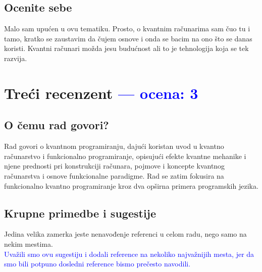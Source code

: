 \documentclass[a4paper]{report}
\newcommand{\odgovor}[1]{\textcolor{blue}{#1}}
\begin{document}
\section{Ocenite sebe}

Malo sam upućen u ovu tematiku. Prosto, o kvantnim računarima sam čuo tu i tamo, 
kratko se zaustavim da čujem osnove i onda se bacim na ono što se danas koristi. 
Kvantni računari možda jesu budućnost ali to je tehnologija koja se tek razvija. 



\chapter{Treći recenzent \odgovor{--- ocena: 3} }

\section{O čemu rad govori?}
Rad govori o kvantnom programiranju, dajući koristan uvod u kvantno računarstvo i funkcionalno programiranje, opisujući efekte kvantne mehanike i njene prednosti pri konstrukciji računara, pojmove i koncepte kvantnog računarstva i osnove funkcionalne paradigme. Rad se zatim fokusira na funkcionalno kvantno programiranje kroz dva opširna primera programskih jezika.

\section{Krupne primedbe i sugestije}
Jedina velika zamerka jeste nenavođenje referenci u celom radu, nego samo na nekim mestima. \\
\odgovor { Uvažili smo ovu sugestiju i dodali reference na nekoliko najvažnijih mesta, jer da smo bili potpuno dosledni reference bismo prečesto navodili. }

\end{document}
